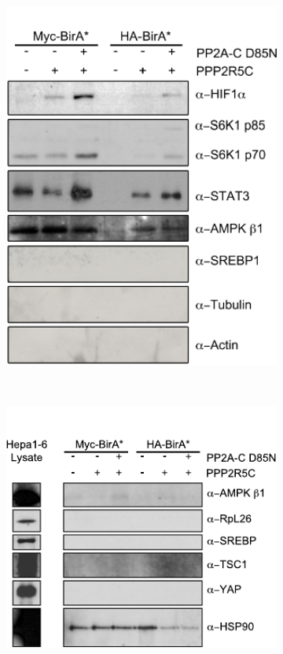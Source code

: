 \begin{figure}[!t]
\centering
	\begin{subfigure}[t]{0.48\textwidth}
	\includegraphics[width=1\textwidth]{figs/fig2-47 bioid target1.pdf}
    \label{fig:fig2.47a}
	\end{subfigure} %
~
	\begin{subfigure}[t]{0.48\textwidth}
	\includegraphics[width=1\textwidth]{figs/fig2-48 bioid target2.pdf}

\end{subfigure}
\end{figure}

